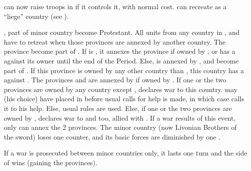 \effetlong
\aparag \SPA can now raise troops in \provinceLombardia if it controls it,
with normal cost.
\aparag \SPA can recreate \paysMilan as a ``liege'' country (see
).






\phevnt
\aparag {}, part of minor country  become
Protestant.  All units from any country in \provincePreussen,  and  have to retreat when those provinces
are annexed by another country.
\aparag The province \provincePreussen become part of .
\bparag If \POL is \CATHCO, it annexes the province if owned by
, or has a \CB against its owner until the end of the
Period.
\bparag Else,  is annexed by \paysBrandebourg, and
\provincePreussen become part of \paysBrandebourg. If this province is owned
by any other country than , this country has a \CB against
\paysBrandebourg.
\aparag The provinces  and  are
annexed by \paysHanse if owned by .
\bparag If one or the two provinces are owned by any country except \POL,
\paysHanse declares war to this country. \POL may (his choice) have \paysHanse
placed in \AM before usual calls for help is made, in which case \paysHanse
calls it to his help. Else, usual rules are used.
\bparag Else, if one or the two provinces are owned by \POL, \paysHanse
declares war to \POL and \paysBrandebourg too, allied with \paysHanse.
\bparag If a war results of this event, only \paysHanse can annex the 2
provinces.
\aparag The minor country  (now Livonian Brothers of the
sword) loses one \ARMY counter, and its basic forces are diminished by one
\ARMY\faceplus.

\phpaix
\aparag If a war is prosecuted between minor countries only, it lasts one turn
and the side of \paysBrandebourg wins (gaining the provinces).





